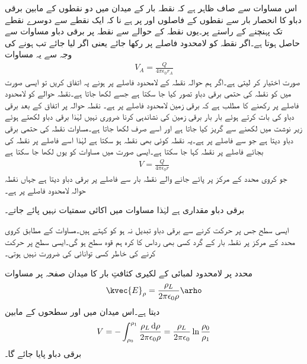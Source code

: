 اس مساوات سے صاف ظاہر ہے کہ نقطہ بار  کے میدان میں دو نقطوں کے مابین برقی دباو کا انحصار بار سے نقطوں کے فاصلوں  اور  پر ہے نا کہ ایک نقطے سے دوسرے نقطے تک پہنچنے کے راستے پر۔یوں نقطہ  کے حوالے سے نقطہ  پر برقی دباو مساوات  سے حاصل ہوتا ہے۔اگر نقطہ  کو لامحدود فاصلے پر رکھا جائے یعنی اگر  لیا جائے تب  ہونے کی وجہ سے  یہ مساوات
\begin{align}\label{مساوات_توانائی_نقطہ_بار_کی_حتمی_دباو}
V_{A}=\frac{Q}{4\pi \epsilon_0 r_A}
\end{align}
صورت اختیار کر لیتی ہے۔اگر ہم  حوالہ نقطہ کے لامحدود فاصلے پر ہونے پہ اتفاق کریں تو ایسی صورت میں  کو نقطہ  کی حتمی برقی دباو تصور کیا جا سکتا ہے جسے  لکھا جاتا ہے۔نقطہ حوالے کو لامحدود فاصلے پر رکھنے کا مطلب ہے کہ برقی زمین لامحدود فاصلے پر ہے۔ نقطہ حوالہ پر اتفاق کے بعد برقی دباو کی بات کرتے ہوئے بار بار برقی زمین کی نشاندہی کرنا ضروری نہیں لہٰذا برقی دباو لکھتے ہوئے زیر نوشت میں  لکھنے سے گریز کیا جاتا ہے اور اسے صرف  لکھا جاتا ہے۔مساوات  نقطہ  کی حتمی برقی دباو دیتا ہے جو  سے  فاصلے پر ہے۔یہ نقطہ کوئی بھی نقطہ ہو سکتا ہے لہٰذا  اسے   فاصلے پر نقطہ  کی بجائے  فاصلے پر نقطہ کہا جا سکتا ہے۔ایسی صورت میں مساوات  کو یوں لکھا جا سکتا ہے
\begin{align}\label{مساوات_توانائی_نقطہ_بار_کی_حتمی_دباو_الف}
V=\frac{Q}{4\pi \epsilon_0 r}
\end{align}
جو کروی محدد کے مرکز پر پائے جانے والے نقطہ بار  سے  فاصلے پر برقی دباو  دیتا ہے جہاں نقطہ حوالہ لامحدود فاصلے پر ہے۔

برقی دباو مقداری ہے لہٰذا مساوات  میں اکائی سمتیات نہیں پائے جاتے۔

ایسی سطح جس پر حرکت کرنے سے برقی دباو تبدیل نہ ہو کو  کہتے ہیں۔مساوات  کے مطابق کروی محدد کے مرکز پر نقطہ بار کے گرد کسی بھی رداس کا کرہ ہم قوہ سطح ہو گی۔ایسی سطح پر حرکت کرنے کی خاطر کسی توانائی کی ضرورت نہیں ہوتی۔

 محدد پر لامحدود لمبائی کے لکیری کثافتِ بار کا میدان صفحہ  پر مساوات 
\begin{align*}
\kvec{E}_\rho=\frac{\rho_L}{2\pi \epsilon_0\rho} \arho
\end{align*}
دیتا ہے۔اس میدان میں  اور  سطحوں کے مابین
\begin{align}\label{مساوات_توانائی_لکیری_بار_برقی_دباو}
V=-\int_{\rho_0}^{\rho_1} \frac{\rho_L  \dif \rho}{2\pi \epsilon_0\rho} =\frac{\rho_L}{2\pi\epsilon_0} \ln \frac{\rho_0}{\rho_1}
\end{align}
برقی دباو پایا جائے گا۔ 

